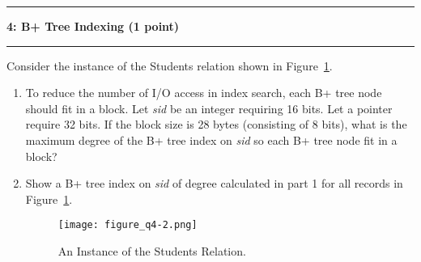 \documentclass[11pt]{article}
\newcommand\question[2]{\vspace{.25in}\hrule\textbf{#1: #2}\vspace{.5em}\hrule\vspace{.10in}}
\begin{document}
\question{4}{B+ Tree Indexing (1 point)}
Consider the instance of the Students relation shown in Figure~\ref{figure:q4}. 
\begin{enumerate}
	
	\item To reduce the number of I/O access in index search, each B+ tree node should fit in a block. Let {\it sid} be an integer requiring 16 bits. Let a pointer require 32 bits.
	If the block size is 28 bytes (consisting of 8 bits), what is the maximum degree of the B+ tree index on {\it sid} so each B+ tree node fit in a block?
	

	\item Show a B+ tree index on {\it sid} of degree calculated in part 1 for all records in Figure~\ref{figure:q4}.
	
	\begin{figure}[h]
		\centering
		\texttt{[image: figure\_q4-2.png]}
		\caption{An Instance of the Students Relation.}
		\label{figure:q4}
	\end{figure}
	

	
	
	

\end{enumerate}
\end{document}
